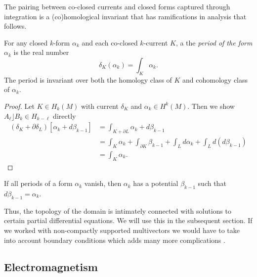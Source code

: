 \documentclass{article}
\begin{document}
The pairing between co-closed currents and closed forms captured through integration is a (co)homological invariant that has ramifications in analysis that follows.
\begin{proposition}
\label{def:period}
For any closed $k$-form $\alpha_k$ and each co-closed $k$-current $K$, a the \emph{period of the form $\alpha_k$} is the real number
\begin{equation}
\delta_K(\alpha_k)=\int_K \alpha_k.
\end{equation}
The period is invariant over both the homology class of $K$ and cohomology class of $\alpha_k$.
\end{proposition}
\begin{proof}
Let $K \in H_k(M)$ with current $\delta_K$ and $\alpha_k \in H^k(M)$. Then we show $A_\ell \rfloor B_k \in H_{k-\ell}$ directly
\begin{align}
(\delta_K+\partial \delta_L)[\alpha_k + d \beta_{k-1}] &= \int_{K+\partial L} \alpha_k + d\beta_{k-1}\\
&= \int_K \alpha_k + \int_{\partial K} \beta_{k-1} + \int_L d \alpha_k + \int_L d(d\beta_{k-1})\\
&= \int_K \alpha_k.
\end{align}
\end{proof}
\begin{proposition}
\label{prop:periods}
    If all periods of a form $\alpha_k$ vanish, then $\alpha_k$ has a potential $\beta_{k-1}$ such that $d\beta_{k-1}=\alpha_k$.
\end{proposition}
Thus, the topology of the domain is intimately connected with solutions to certain partial differential equations. We will use this in the subsequent section. If we worked with non-compactly supported multivectors we would have to take into account boundary conditions which adds many more complications \cite{schwarz_hodge_1995}.

\subsection{Electromagnetism}
\end{document}
